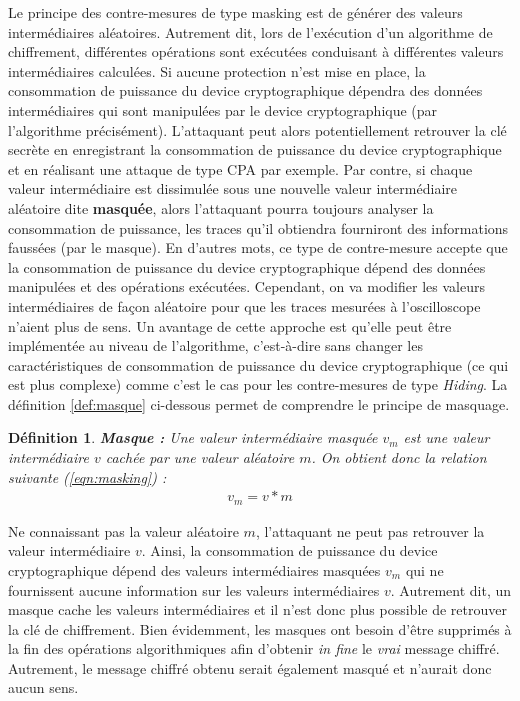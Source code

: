 \documentclass[oneside]{book}
\newtheorem{definition}{Définition}[section]
\begin{document}
Le principe des contre-mesures de type masking est de générer des valeurs intermédiaires aléatoires. Autrement dit, lors de l'exécution d'un algorithme de chiffrement, différentes opérations sont exécutées conduisant à différentes valeurs intermédiaires calculées. Si aucune protection n'est mise en place, la consommation de puissance du device cryptographique dépendra des données intermédiaires qui sont manipulées par le device cryptographique (par l'algorithme précisément). L'attaquant peut alors potentiellement retrouver la clé secrète en enregistrant la consommation de puissance du device cryptographique et en réalisant une attaque de type CPA par exemple. Par contre, si chaque valeur intermédiaire est dissimulée sous une nouvelle valeur intermédiaire aléatoire dite \textbf{masquée}, alors l'attaquant pourra toujours analyser la consommation de puissance, les traces qu'il obtiendra fourniront des informations faussées (par le masque). En d'autres mots, ce type de contre-mesure accepte que la consommation de puissance du device cryptographique dépend des données manipulées et des opérations exécutées. Cependant, on va modifier les valeurs intermédiaires de façon aléatoire pour que les traces mesurées à l'oscilloscope n'aient plus de sens. Un avantage de cette approche est qu'elle peut être implémentée au niveau de l'algorithme, c'est-à-dire sans changer les caractéristiques de consommation de puissance du device cryptographique (ce qui est plus complexe) comme c'est le cas pour les contre-mesures de type \textit{Hiding}. La définition \ref{def:masque} ci-dessous permet de comprendre le principe de masquage. 

\theoremstyle{definition}
\begin{definition}{\textbf{Masque :}}
Une valeur intermédiaire masquée $v_m$ est une valeur intermédiaire $v$ cachée par une valeur aléatoire $m$. On obtient donc la relation suivante (\ref{eqn:masking}) : 
\begin{gather}
	v_m = v * m\label{eqn:masking}
\end{gather}
\end{definition}
\label{def:masque}

\hspace{-0.5cm}Ne connaissant pas la valeur aléatoire $m$, l'attaquant ne peut pas retrouver la valeur intermédiaire $v$. Ainsi, la consommation de puissance du device cryptographique dépend des valeurs intermédiaires masquées $v_m$ qui ne fournissent aucune information sur les valeurs intermédiaires $v$. Autrement dit, un masque cache les valeurs intermédiaires et il n'est donc plus possible de retrouver la clé de chiffrement. Bien évidemment, les masques ont besoin d'être supprimés à la fin des opérations algorithmiques afin d'obtenir \textit{in fine} le \textit{vrai} message chiffré. Autrement, le message chiffré obtenu serait également masqué et n'aurait donc aucun sens.
\end{document}
